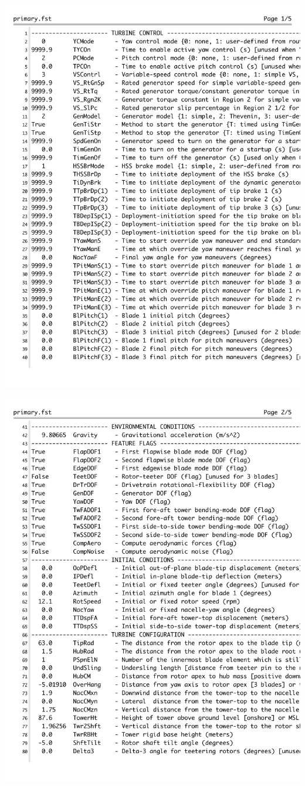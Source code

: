 \includegraphics[width=.95\linewidth]{Figures/AppendixAFigures/primaryP2.pdf}

\includegraphics[width=.95\linewidth]{Figures/AppendixAFigures/primaryP3.pdf}	

